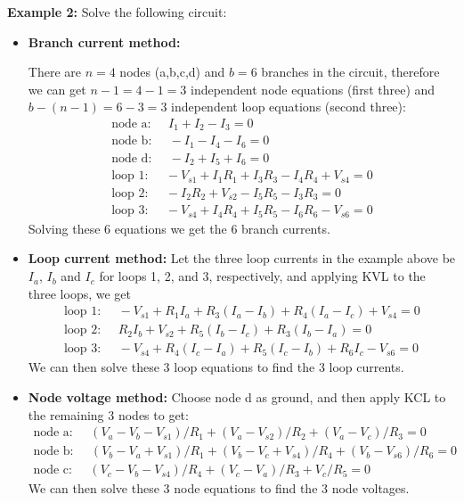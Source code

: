 {\bf Example 2:} Solve the following circuit:


\begin{itemize}
\item {\bf Branch current method:}

  There are $n=4$ nodes (a,b,c,d) and $b=6$ branches in the circuit, 
  therefore we can get $n-1=4-1=3$ independent node equations (first
  three) and $b-(n-1)=6-3=3$ independent loop equations (second three):
  \[ \begin{array}{l}
    \mbox{node a:}\;\;\;\;\; I_1+I_2-I_3=0 	\\
    \mbox{node b:}\;\;\;\;\;-I_1-I_4-I_6=0 	\\
    \mbox{node d:}\;\;\;\;\;-I_2+I_5+I_6=0 	\\
    \mbox{loop 1:}\;\;\;\;\;-V_{s1}+I_1R_1+I_3R_3-I_4R_4+V_{s4}=0 \\
    \mbox{loop 2:}\;\;\;\;\;-I_2R_2+V_{s2}-I_5R_5-I_3R_3=0	 \\
    \mbox{loop 3:}\;\;\;\;\;-V_{s4}+I_4R_4+I_5R_5-I_6R_6-V_{s6}=0 
  \end{array} \]
  Solving these 6 equations we get the 6 branch currents.

\item {\bf Loop current method:}
  Let the three loop currents in the example above be $I_a$, $I_b$ and $I_c$ 
  for loops 1, 2, and 3, respectively, and applying KVL to the three loops,
  we get
  \[ \begin{array}{l}
    \mbox{loop 1:}\;\;\;\;\;-V_{s1}+R_1I_a+R_3(I_a-I_b)+R_4(I_a-I_c)+V_{s4}=0 \\
    \mbox{loop 2:}\;\;\;\;\;R_2I_b+V_{s2}+R_5(I_b-I_c)+R_3(I_b-I_a)=0 \\
    \mbox{loop 3:}\;\;\;\;\;-V_{s4}+R_4(I_c-I_a)+R_5(I_c-I_b)+R_6I_c-V_{s6}=0 
  \end{array} \]
  We can then solve these 3 loop equations to find the 3 loop currents.
\item {\bf Node voltage method:}
  Choose node d as ground, and then apply KCL to the remaining 3 nodes to get:
  \[ \begin{array}{l}
    \mbox{node a:}\;\;\;\;\;(V_a-V_b-V_{s1})/R_1+(V_a-V_{s2})/R_2+(V_a-V_c)/R_3=0 \\
    \mbox{node b:}\;\;\;\;\;(V_b-V_a+V_{s1})/R_1+(V_b-V_c+V_{s4})/R_4+(V_b-V_{s6})/R_6=0 \\
    \mbox{node c:}\;\;\;\;\;(V_c-V_b-V_{s4})/R_4+(V_c-V_a)/R_3+V_c/R_5=0 
  \end{array} \]
  We can then solve these 3 node equations to find the 3 node voltages.

\end{itemize}


